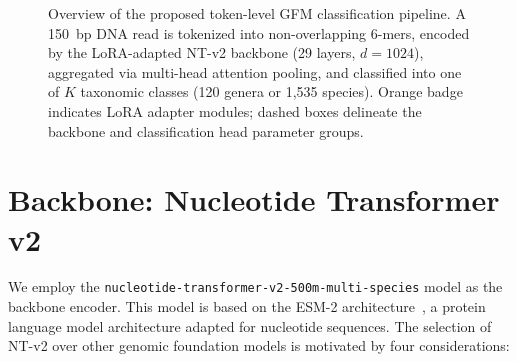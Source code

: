 \begin{figure}[htbp]
{%
}
\caption{Overview of the proposed token-level GFM classification pipeline. A 150~bp DNA read is tokenized into non-overlapping 6-mers, encoded by the LoRA-adapted NT-v2 backbone (29 layers, $d{=}1024$), aggregated via multi-head attention pooling, and classified into one of $K$ taxonomic classes (120 genera or 1,535 species). Orange badge indicates LoRA adapter modules; dashed boxes delineate the backbone and classification head parameter groups.}
\label{fig:system-overview}
\end{figure}

\section{Backbone: Nucleotide Transformer v2}
\label{sec:method-backbone}

We employ the \texttt{nucleotide-transformer-v2-500m-multi-species} model as the backbone encoder. This model is based on the ESM-2 architecture~\cite{Lin2023}, a protein language model architecture adapted for nucleotide sequences. The selection of NT-v2 over other genomic foundation models is motivated by four considerations:

